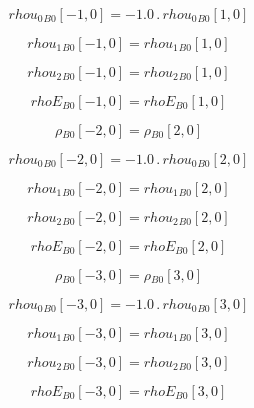 \documentclass{article}
\begin{document}
\begin{dmath}{rhou_{0}{_{B0}}}[{-1,0}] = - 1.0 \,.\, {rhou_{0}{_{B0}}}[{1,0}]\end{dmath}

\begin{dmath}{rhou_{1}{_{B0}}}[{-1,0}] = {rhou_{1}{_{B0}}}[{1,0}]\end{dmath}

\begin{dmath}{rhou_{2}{_{B0}}}[{-1,0}] = {rhou_{2}{_{B0}}}[{1,0}]\end{dmath}

\begin{dmath}{rhoE{_{B0}}}[{-1,0}] = {rhoE{_{B0}}}[{1,0}]\end{dmath}

\begin{dmath}{\rho{_{B0}}}[{-2,0}] = {\rho{_{B0}}}[{2,0}]\end{dmath}

\begin{dmath}{rhou_{0}{_{B0}}}[{-2,0}] = - 1.0 \,.\, {rhou_{0}{_{B0}}}[{2,0}]\end{dmath}

\begin{dmath}{rhou_{1}{_{B0}}}[{-2,0}] = {rhou_{1}{_{B0}}}[{2,0}]\end{dmath}

\begin{dmath}{rhou_{2}{_{B0}}}[{-2,0}] = {rhou_{2}{_{B0}}}[{2,0}]\end{dmath}

\begin{dmath}{rhoE{_{B0}}}[{-2,0}] = {rhoE{_{B0}}}[{2,0}]\end{dmath}

\begin{dmath}{\rho{_{B0}}}[{-3,0}] = {\rho{_{B0}}}[{3,0}]\end{dmath}

\begin{dmath}{rhou_{0}{_{B0}}}[{-3,0}] = - 1.0 \,.\, {rhou_{0}{_{B0}}}[{3,0}]\end{dmath}

\begin{dmath}{rhou_{1}{_{B0}}}[{-3,0}] = {rhou_{1}{_{B0}}}[{3,0}]\end{dmath}

\begin{dmath}{rhou_{2}{_{B0}}}[{-3,0}] = {rhou_{2}{_{B0}}}[{3,0}]\end{dmath}

\begin{dmath}{rhoE{_{B0}}}[{-3,0}] = {rhoE{_{B0}}}[{3,0}]\end{dmath}
\end{document}
